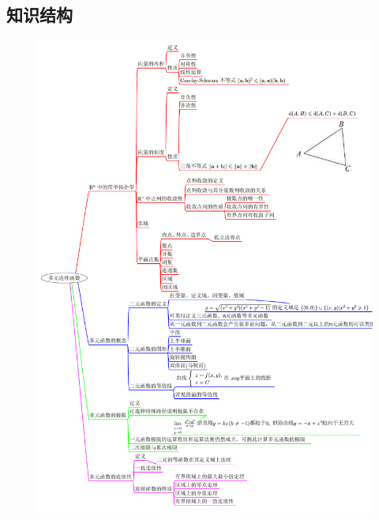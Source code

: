 \documentclass[12pt,UTF8]{ctexart}
\begin{document}
\subsection{知识结构}
\begin{figure}[H]
\begin{center}
\includegraphics[height=0.95\textheight]{20190605.pdf}
\end{center}
\end{figure}
\end{document}
